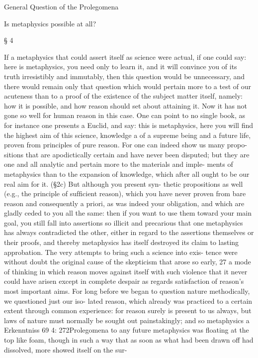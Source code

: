 General Question of the Prolegomena

Is metaphysics possible at all?

§ 4

If a metaphysics that could assert itself as science were actual, if one could
say: here is metaphysics, you need only to learn it, and it will convince
you of its truth irresistibly and immutably, then this question would be
unnecessary, and there would remain only that question which would
pertain more to a test of our acuteness than to a proof of the existence of
the subject matter itself, namely: how it is possible, and how reason should
set about attaining it. Now it has not gone so well for human reason in
this case. One can point to no single book, as for instance one presents
a Euclid, and say: this is metaphysics, here you will ﬁnd the highest aim
of this science, knowledge a of a supreme being and a future life, proven
from principles of pure reason. For one can indeed show us many propo-
sitions that are apodictically certain and have never been disputed; but
they are one and all analytic and pertain more to the materials and imple-
ments of metaphysics than to the expansion of knowledge, which after
all ought to be our real aim for it. (§2c) But although you present syn-
thetic propositions as well (e.g., the principle of sufﬁcient reason), which
you have never proven from bare reason and consequently a priori, as
was indeed your obligation, and which are gladly ceded to you all the
same: then if you want to use them toward your main goal, you still fall
into assertions so illicit and precarious that one metaphysics has always
contradicted the other, either in regard to the assertions themselves or
their proofs, and thereby metaphysics has itself destroyed its claim to
lasting approbation. The very attempts to bring such a science into exis-
tence were without doubt the original cause of the skepticism that arose
so early, 27 a mode of thinking in which reason moves against itself with
such violence that it never could have arisen except in complete despair
as regards satisfaction of reason’s most important aims. For long before
we began to question nature methodically, we questioned just our iso-
lated reason, which already was practiced to a certain extent through
common experience: for reason surely is present to us always, but laws
of nature must normally be sought out painstakingly; and so metaphysics
a
Erkenntniss
69
4: 272Prolegomena to any future metaphysics
was ﬂoating at the top like foam, though in such a way that as soon as
what had been drawn off had dissolved, more showed itself on the sur-
